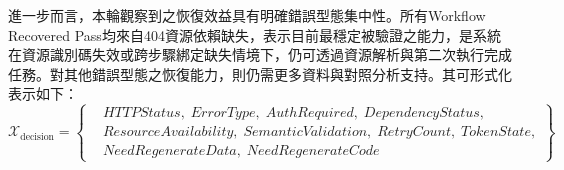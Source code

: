 \begin{ZhChapter}
\text 進一步而言，本輪觀察到之恢復效益具有明確錯誤型態集中性。所有Workflow Recovered Pass均來自404資源依賴缺失，表示目前最穩定被驗證之能力，是系統在資源識別碼失效或跨步驟綁定缺失情境下，仍可透過資源解析與第二次執行完成任務。對其他錯誤型態之恢復能力，則仍需更多資料與對照分析支持。其可形式化表示如下：
\begin{equation}
\label{eq:decision_variable_set_ch4}
\mathcal{X}_{\mathrm{decision}}=
\left\{
\begin{aligned}
&HTTPStatus,\; ErrorType,\; AuthRequired,\; DependencyStatus,\\
&ResourceAvailability,\; SemanticValidation,\; RetryCount,\; TokenState,\\
&NeedRegenerateData,\; NeedRegenerateCode
\end{aligned}
\right\}
\end{equation}


\end{ZhChapter}
